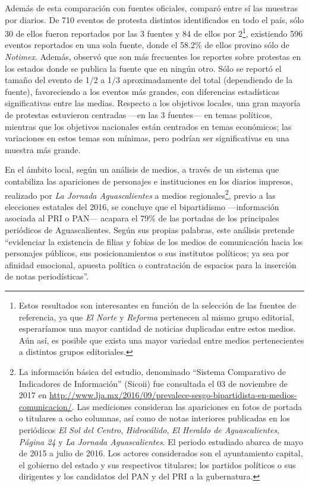 \documentclass[letterpaper, 11pt]{book}
\theoremstyle{definition}
\theoremstyle{remark}
\begin{document}
Además de esta comparación con fuentes oficiales, \citet{2008_Strawn_mediaValidity} comparó entre sí las muestras por diarios. 
De 710 eventos de protesta distintos identificados en todo el país, sólo 30 de ellos fueron reportados por las 3 fuentes y 84 de ellos por 2\footnote{Estos resultados son interesantes en función de la selección de las fuentes de referencia, ya que \emph{El Norte} y \emph{Reforma} pertenecen al mismo grupo editorial, esperaríamos una mayor cantidad de noticias duplicadas entre estos medios. 
Aún así, es posible que exista una mayor variedad entre medios pertenecientes a distintos grupos editoriales.}, existiendo 596 eventos reportados en una sola fuente, donde el 58.2\% de ellos provino sólo de \emph{Notimex}. 
Además, observó que son más frecuentes los reportes sobre protestas en los estados donde se publica la fuente que en ningún otro. Sólo se reportó el tamaño del evento de 1/2  a 1/3 aproximadamente del total (dependiendo de la fuente), favoreciendo a los eventos más grandes, con diferencias estadísticas significativas entre las medias. 
Respecto a los objetivos locales, una gran mayoría de protestas estuvieron centradas ---en las 3 fuentes--- en temas políticos, mientras que los objetivos nacionales están centrados en temas económicos; las variaciones en estos temas son mínimas, pero podrían ser significativas en una muestra más grande.


En el ámbito local, según un análisis de medios, a través de un sistema que contabiliza las apariciones de personajes e instituciones en los diarios impresos, realizado por \emph{La Jornada Aguascalientes} a medios regionales\footnote{La información básica del estudio, denominado ``Sistema Comparativo de Indicadores de Información'' (Sicoii) fue consultada el 03 de noviembre de 2017 en \url{http://www.lja.mx/2016/09/prevalece-sesgo-bipartidista-en-medios-comunicacion/}. 
Las mediciones consideran las apariciones en fotos de portada o titulares a ocho columnas, así como de notas interiores publicadas en los periódicos \emph{El Sol del Centro}, \emph{Hidrocálido}, \emph{El Heraldo de Aguascalientes}, \emph{Página 24} y \emph{La Jornada Aguascalientes}. 
El periodo estudiado abarca de mayo de 2015 a julio de 2016. Los actores considerados son el ayuntamiento capital, el gobierno del estado y sus respectivos titulares; los partidos políticos o sus dirigentes y los candidatos del PAN y del PRI a la gubernatura.}, previo a las elecciones estatales del 2016, se concluye que el bipartidismo ---información asociada al PRI o PAN--- acapara el 79\% de las portadas de los principales periódicos de Aguascalientes. 
Según sus propias palabras, este análisis pretende ``evidenciar la existencia de filias y fobias de los medios de comunicación hacia los personajes públicos, sus posicionamientos o sus institutos políticos; ya sea por afinidad emocional, apuesta política o contratación de espacios para la inserción de notas periodísticas''.
\end{document}
